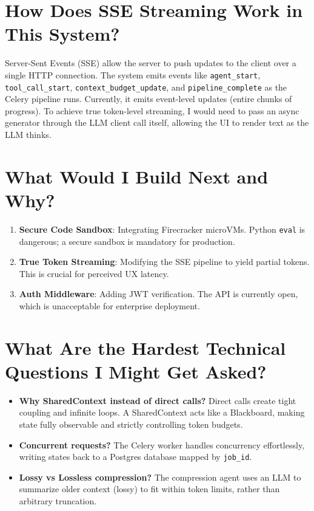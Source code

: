 \documentclass[11pt]{article}
\begin{document}
\section{How Does SSE Streaming Work in This System?}
Server-Sent Events (SSE) allow the server to push updates to the client over a single HTTP connection. The system emits events like \texttt{agent\_start}, \texttt{tool\_call\_start}, \texttt{context\_budget\_update}, and \texttt{pipeline\_complete} as the Celery pipeline runs. Currently, it emits event-level updates (entire chunks of progress). To achieve true token-level streaming, I would need to pass an async generator through the LLM client call itself, allowing the UI to render text as the LLM thinks.

\section{What Would I Build Next and Why?}
\begin{enumerate}
    \item \textbf{Secure Code Sandbox}: Integrating Firecracker microVMs. Python \texttt{eval} is dangerous; a secure sandbox is mandatory for production.
    \item \textbf{True Token Streaming}: Modifying the SSE pipeline to yield partial tokens. This is crucial for perceived UX latency.
    \item \textbf{Auth Middleware}: Adding JWT verification. The API is currently open, which is unacceptable for enterprise deployment.
\end{enumerate}

\section{What Are the Hardest Technical Questions I Might Get Asked?}
\begin{itemize}
    \item \textbf{Why SharedContext instead of direct calls?} Direct calls create tight coupling and infinite loops. A SharedContext acts like a Blackboard, making state fully observable and strictly controlling token budgets.
    \item \textbf{Concurrent requests?} The Celery worker handles concurrency effortlessly, writing states back to a Postgres database mapped by \texttt{job\_id}.
    \item \textbf{Lossy vs Lossless compression?} The compression agent uses an LLM to summarize older context (lossy) to fit within token limits, rather than arbitrary truncation.
\end{itemize}
\end{document}
